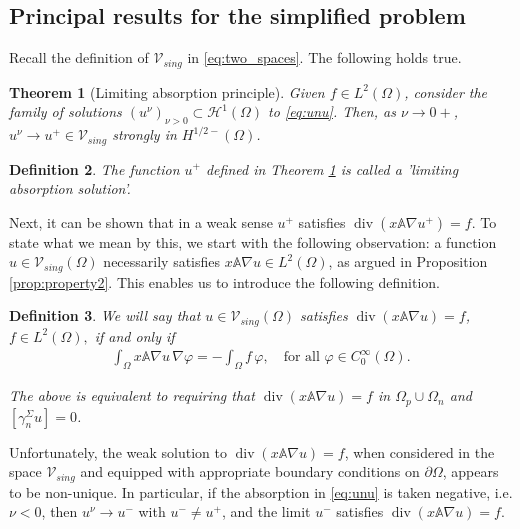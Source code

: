 \documentclass[report]{elsarticle}
\newtheorem{theorem}{Theorem}[section]
\newtheorem{definition}[theorem]{Definition}
\numberwithin{theorem}{section}
\renewcommand{\vec}[1]{\mathbf{#1}}
\begin{document}
\subsection{Principal results for the simplified problem}
\label{sec:simplified}
%
%
%
Recall the definition of $\mathcal{V}_{sing}$ in \eqref{eq:two_spaces}. The following holds true. 
\begin{theorem}[Limiting absorption principle]
	\label{theorem:LAP}
	Given $f\in L^2(\Omega)$, consider the family of solutions  $(u^{\nu})_{\nu>0}\subset \mathcal{H}^1(\Omega)$ to \eqref{eq:unu}. Then, as $\nu\rightarrow 0+$, $u^{\nu}\rightarrow u^+\in \mathcal{V}_{sing}$ strongly in  $H^{1/2-}(\Omega)$. 
\end{theorem}
\begin{definition}
	The function $u^+$ defined in Theorem \ref{theorem:LAP} is called a 'limiting absorption solution'. 
\end{definition}
Next, it can be shown that in a weak sense $u^+$ satisfies $\operatorname{div}( x  \mathbb{A}\nabla u^+)=f$. To state what we mean by this, we start with the following observation: a function $u\in \mathcal{V}_{sing}(\Omega)$ necessarily satisfies $x\mathbb{A}\nabla u\in L^2(\Omega)$, as argued in Proposition \ref{prop:property2}. This enables us to introduce the following definition.
\begin{definition}
	\label{def:st}
	We will say that $u\in \mathcal{V}_{sing}(\Omega)$ satisfies  $\operatorname{div}(x\mathbb{A}\nabla u)=f$, $f\in L^2(\Omega),$ if and only if 
	\begin{align*}
		\int_{\Omega}x\mathbb{A}\nabla u\,\nabla \varphi=-\int_{\Omega}f\,\varphi, \quad  \text{for all }\varphi\in C_0^{\infty}(\Omega).
	\end{align*}
	
	The above is equivalent to requiring that
	$\operatorname{div}(x\mathbb{A}\nabla u)=f$ in $\Omega_p\cup\Omega_n$ and $[\gamma_n^{\Sigma}u]=0$. 
\end{definition}
Unfortunately, the weak solution to $\operatorname{div}( x \mathbb{A} \nabla u)=f$, when considered in the space $\mathcal{V}_{sing}$ and equipped with appropriate boundary conditions on $\partial\Omega$, appears to be non-unique. In particular, if the absorption in \eqref{eq:unu} is taken negative, i.e. $\nu<0$, then  $u^{\nu}\rightarrow u^{-}$ with $u^{-}\neq u^+$, and the limit $u^{-}$ satisfies $\operatorname{div}(x\mathbb{A}\nabla u)=f$. 
\end{document}
